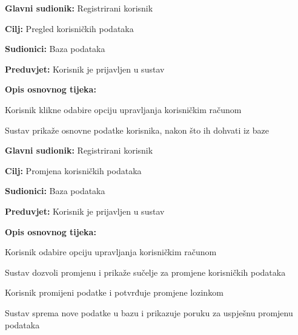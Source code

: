 \noindent {}
\begin{packed_item}
	
	\item \textbf{Glavni sudionik: } Registrirani korisnik
	\item  \textbf{Cilj:} Pregled korisničkih podataka
	\item  \textbf{Sudionici:} Baza podataka
	\item  \textbf{Preduvjet:} Korisnik je prijavljen u sustav
	\item  \textbf{Opis osnovnog tijeka:}
	
	\item[] \begin{packed_enum}
		
		\item Korisnik klikne odabire opciju upravljanja korisničkim računom
		\item Sustav prikaže osnovne podatke korisnika, nakon što ih dohvati iz baze
	\end{packed_enum}
	
\end{packed_item}

\noindent {}
\begin{packed_item}
	
	\item \textbf{Glavni sudionik: } Registrirani korisnik
	\item  \textbf{Cilj:} Promjena korisničkih podataka
	\item  \textbf{Sudionici:} Baza podataka
	\item  \textbf{Preduvjet:} Korisnik je prijavljen u sustav
	\item  \textbf{Opis osnovnog tijeka:}
	
	\item[] \begin{packed_enum}
		
		\item Korisnik odabire opciju upravljanja korisničkim računom
		\item Sustav dozvoli promjenu i prikaže sučelje za promjene korisničkih
		podataka
		\item Korisnik promijeni podatke i potvrđuje promjene lozinkom
		\item Sustav sprema nove podatke u bazu i prikazuje poruku za uspješnu
		promjenu podataka
	\end{packed_enum}
	
\end{packed_item}

